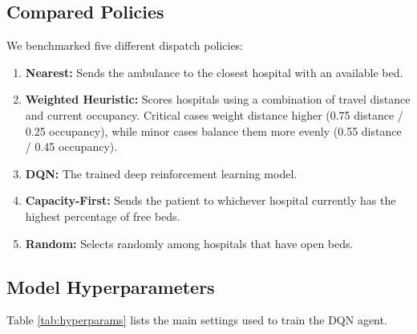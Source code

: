 \documentclass[11pt,a4paper]{article}
\begin{document}
\subsection{Compared Policies}
We benchmarked five different dispatch policies:
\begin{enumerate}[leftmargin=*]
    \item \textbf{Nearest:} Sends the ambulance to the closest hospital with an available bed.
    \item \textbf{Weighted Heuristic:} Scores hospitals using a combination of travel distance and current occupancy. Critical cases weight distance higher (0.75 distance / 0.25 occupancy), while minor cases balance them more evenly (0.55 distance / 0.45 occupancy).
    \item \textbf{DQN:} The trained deep reinforcement learning model.
    \item \textbf{Capacity-First:} Sends the patient to whichever hospital currently has the highest percentage of free beds.
    \item \textbf{Random:} Selects randomly among hospitals that have open beds.
\end{enumerate}

\subsection{Model Hyperparameters}
Table \ref{tab:hyperparams} lists the main settings used to train the DQN agent.

\begin{table}[H]
    \centering
    \caption{DQN Training Hyperparameters.}
    \label{tab:hyperparams}
\end{table}
\end{document}
